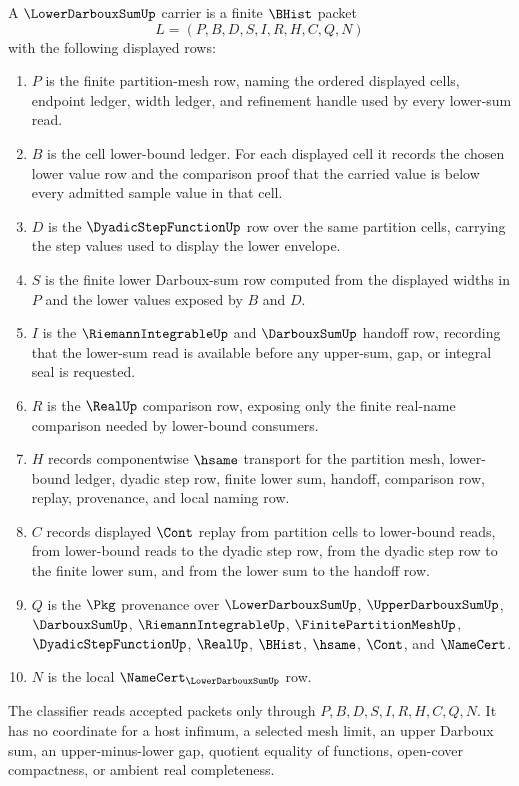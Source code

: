 \begin{definition}\label{def:lower-darboux-sum-carrier}
A $\LowerDarbouxSumUp$ carrier is a finite $\BHist$ packet
$$
L=(P,B,D,S,I,R,H,C,Q,N)
$$
with the following displayed rows:
\begin{enumerate}
\item $P$ is the finite partition-mesh row, naming the ordered displayed cells, endpoint ledger, width ledger, and refinement handle used by every lower-sum read.
\item $B$ is the cell lower-bound ledger. For each displayed cell it records the chosen lower value row and the comparison proof that the carried value is below every admitted sample value in that cell.
\item $D$ is the $\DyadicStepFunctionUp$ row over the same partition cells, carrying the step values used to display the lower envelope.
\item $S$ is the finite lower Darboux-sum row computed from the displayed widths in $P$ and the lower values exposed by $B$ and $D$.
\item $I$ is the $\RiemannIntegrableUp$ and $\DarbouxSumUp$ handoff row, recording that the lower-sum read is available before any upper-sum, gap, or integral seal is requested.
\item $R$ is the $\RealUp$ comparison row, exposing only the finite real-name comparison needed by lower-bound consumers.
\item $H$ records componentwise $\hsame$ transport for the partition mesh, lower-bound ledger, dyadic step row, finite lower sum, handoff, comparison row, replay, provenance, and local naming row.
\item $C$ records displayed $\Cont$ replay from partition cells to lower-bound reads, from lower-bound reads to the dyadic step row, from the dyadic step row to the finite lower sum, and from the lower sum to the handoff row.
\item $Q$ is the $\Pkg$ provenance over $\LowerDarbouxSumUp$, $\UpperDarbouxSumUp$, $\DarbouxSumUp$, $\RiemannIntegrableUp$, $\FinitePartitionMeshUp$, $\DyadicStepFunctionUp$, $\RealUp$, $\BHist$, $\hsame$, $\Cont$, and $\NameCert$.
\item $N$ is the local $\NameCert_{\LowerDarbouxSumUp}$ row.
\end{enumerate}
The classifier reads accepted packets only through $P,B,D,S,I,R,H,C,Q,N$. It has no coordinate for a host infimum, a selected mesh limit, an upper Darboux sum, an upper-minus-lower gap, quotient equality of functions, open-cover compactness, or ambient real completeness.
\end{definition}

